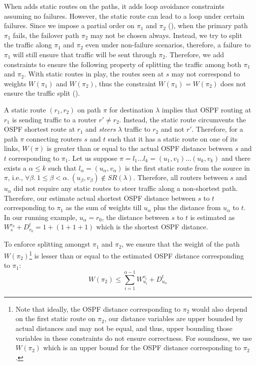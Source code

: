 When \name adds static routes on the paths, it 
adds loop avoidance constraints assuming no failures. 
However, the static route can lead to a loop under certain
failures. 
Since we impose a partial order on $\pi_1$ and $\pi_2$ (), 
when the primary path $\pi_1$ fails, the 
failover path $\pi_2$ may not be chosen always. 
Instead, we try to split the traffic
along $\pi_1$ and $\pi_2$ even under non-failure scenarios,
therefore, a failure to $\pi_1$
will still ensure that traffic will be 
sent through $\pi_2$. Therefore, we add constraints 
to ensure the following property of splitting 
the traffic among both $\pi_1$ and $\pi_2$. With 
static routes in play, the routes seen at $s$ may not 
correspond to weights $W(\pi_1)$ and  $W(\pi_2)$, thus
the constraint $W(\pi_1) = W(\pi_2)$ does not ensure the 
traffic split ().

A static route $(r_1, r_2)$ on path $\pi$ for destination $\lambda$ implies that OSPF routing at $r_1$ is sending traffic to a 
router $r' \not= r_2$. Instead, the static route circumvents 
the OSPF shortest route at $r_1$ and \emph{steers} $\lambda$ 
traffic to $r_2$ and not $r'$. Therefore, for a 
path $\pi$ connecting routers $s$ and $t$ such that it 
has a static route on one of its links, 
$W(\pi)$ is greater than or equal to the 
actual OSPF distance
between $s$ and $t$ corresponding to $\pi_1$. 
Let us suppose $\pi = l_1 \ldots l_k = (u_1, v_1) \ldots (u_k, v_k)$ 
and 
there exists a $\alpha \leq k$ such that 
$l_\alpha = (u_\alpha, v_\alpha)$  
is the first 
static route from the source in $\pi$, i.e., 
$\forall \beta. ~1 \leq \beta < \alpha. ~(u_\beta, v_\beta) \not\in SR(\lambda)$.
Therefore, all routers between $s$ and $u_\alpha$ did
not require any static routes to steer traffic along a 
non-shortest path. Therefore, our estimate
actual shortest OSPF distance  between $s$ to $t$ 
corresponding to $\pi_1$ 
as the sum of weights till $u_\alpha$ plus the distance
from $u_\alpha$ to $t$. In our running example, 
$u_\alpha = r_0$, the distance between $s$ to $t$ 
is estimated as $W_s^{r_0} + D_{r_0}^t = 1 + (1 + 1 + 1)$
which is the shortest OSPF distance. 

To enforce splitting amongst
$\pi_1$ and $\pi_2$, we ensure that the weight 
of the path $W(\pi_2)$\footnote{
Note that ideally, the OSPF distance corresponding to 
$\pi_2$ would also depend on the first static route on
$\pi_2$, our distance variables are upper bounded by actual
distances and may not be equal, and thus, upper bounding 
those variables in these constraints do not ensure correctness.
For soundness, we use $W(\pi_2)$ which is an upper bound
for the OSPF distance corresponding to 
$\pi_2$. 
} 
is lesser than or equal to 
the estimated OSPF distance corresponding to $\pi_1$: 
\begin{equation}
	W(\pi_2) \leq \sum_{i=1}^{\alpha - 1} W_{u_i}^{v_i} + D_{u_\alpha}^t	
\end{equation}

